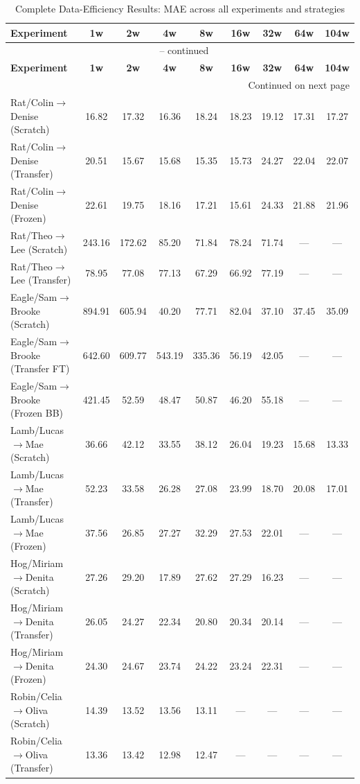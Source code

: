 \documentclass[12pt,a4paper]{report}
\begin{document}
\begin{longtable}{lcccccccc}
\caption{Complete Data-Efficiency Results: MAE across all experiments and strategies} \\
\toprule
\textbf{Experiment} & \textbf{1w} & \textbf{2w} & \textbf{4w} & \textbf{8w} & \textbf{16w} & \textbf{32w} & \textbf{64w} & \textbf{104w} \\
\midrule
\endfirsthead
\multicolumn{9}{c}{{\tablename\ \thetable{} -- continued}} \\
\toprule
\textbf{Experiment} & \textbf{1w} & \textbf{2w} & \textbf{4w} & \textbf{8w} & \textbf{16w} & \textbf{32w} & \textbf{64w} & \textbf{104w} \\
\midrule
\endhead
\midrule
\multicolumn{9}{r}{{Continued on next page}} \\
\endfoot
\bottomrule
\endlastfoot
Rat/Colin$\to$Denise (Scratch) & 16.82 & 17.32 & 16.36 & 18.24 & 18.23 & 19.12 & 17.31 & 17.27 \\
Rat/Colin$\to$Denise (Transfer) & 20.51 & 15.67 & 15.68 & 15.35 & 15.73 & 24.27 & 22.04 & 22.07 \\
Rat/Colin$\to$Denise (Frozen) & 22.61 & 19.75 & 18.16 & 17.21 & 15.61 & 24.33 & 21.88 & 21.96 \\
\midrule
Rat/Theo$\to$Lee (Scratch) & 243.16 & 172.62 & 85.20 & 71.84 & 78.24 & 71.74 & --- & --- \\
Rat/Theo$\to$Lee (Transfer) & 78.95 & 77.08 & 77.13 & 67.29 & 66.92 & 77.19 & --- & --- \\
\midrule
Eagle/Sam$\to$Brooke (Scratch) & 894.91 & 605.94 & 40.20 & 77.71 & 82.04 & 37.10 & 37.45 & 35.09 \\
Eagle/Sam$\to$Brooke (Transfer FT) & 642.60 & 609.77 & 543.19 & 335.36 & 56.19 & 42.05 & --- & --- \\
Eagle/Sam$\to$Brooke (Frozen BB) & 421.45 & 52.59 & 48.47 & 50.87 & 46.20 & 55.18 & --- & --- \\
\midrule
Lamb/Lucas$\to$Mae (Scratch) & 36.66 & 42.12 & 33.55 & 38.12 & 26.04 & 19.23 & 15.68 & 13.33 \\
Lamb/Lucas$\to$Mae (Transfer) & 52.23 & 33.58 & 26.28 & 27.08 & 23.99 & 18.70 & 20.08 & 17.01 \\
Lamb/Lucas$\to$Mae (Frozen) & 37.56 & 26.85 & 27.27 & 32.29 & 27.53 & 22.01 & --- & --- \\
\midrule
Hog/Miriam$\to$Denita (Scratch) & 27.26 & 29.20 & 17.89 & 27.62 & 27.29 & 16.23 & --- & --- \\
Hog/Miriam$\to$Denita (Transfer) & 26.05 & 24.27 & 22.34 & 20.80 & 20.34 & 20.14 & --- & --- \\
Hog/Miriam$\to$Denita (Frozen) & 24.30 & 24.67 & 23.74 & 24.22 & 23.24 & 22.31 & --- & --- \\
\midrule
Robin/Celia$\to$Oliva (Scratch) & 14.39 & 13.52 & 13.56 & 13.11 & --- & --- & --- & --- \\
Robin/Celia$\to$Oliva (Transfer) & 13.36 & 13.42 & 12.98 & 12.47 & --- & --- & --- & --- \\
\end{longtable}
\end{document}
